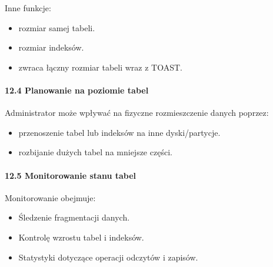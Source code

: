 \documentclass[letterpaper,10pt,polish]{sphinxmanual}
\begin{document}
\sphinxAtStartPar
Inne funkcje:
\begin{itemize}
\item {} 
\sphinxAtStartPar
{} \textendash{} rozmiar samej tabeli.

\item {} 
\sphinxAtStartPar
{} \textendash{} rozmiar indeksów.

\item {} 
\sphinxAtStartPar
{} \textendash{} zwraca łączny rozmiar tabeli wraz z TOAST.

\end{itemize}


\paragraph{12.4 Planowanie na poziomie tabel}
\label{\detokenize{rozdzial2/Konfiguracja_baz_danych/Konfiguracja_baz_danych:planowanie-na-poziomie-tabel}}
\sphinxAtStartPar
Administrator może wpływać na fizyczne rozmieszczenie danych poprzez:
\begin{itemize}
\item {} 
\sphinxAtStartPar
{} \textendash{} przenoszenie tabel lub indeksów na inne dyski/partycje.

\item {} 
\sphinxAtStartPar
{} \textendash{} rozbijanie dużych tabel na mniejsze części.

\end{itemize}


\paragraph{12.5 Monitorowanie stanu tabel}
\label{\detokenize{rozdzial2/Konfiguracja_baz_danych/Konfiguracja_baz_danych:monitorowanie-stanu-tabel}}
\sphinxAtStartPar
Monitorowanie obejmuje:
\begin{itemize}
\item {} 
\sphinxAtStartPar
Śledzenie fragmentacji danych.

\item {} 
\sphinxAtStartPar
Kontrolę wzrostu tabel i indeksów.

\item {} 
\sphinxAtStartPar
Statystyki dotyczące operacji odczytów i zapisów.

\end{itemize}
\end{document}
